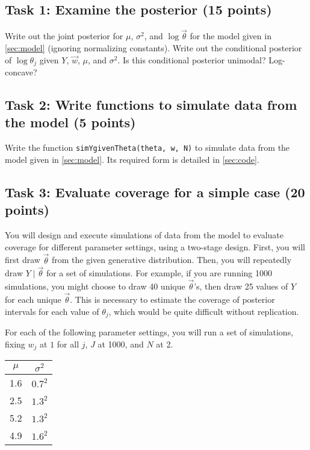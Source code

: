 \documentclass[11pt]{article}
\begin{document}
\subsection{Task 1: Examine the posterior (15 points)}

Write out the joint posterior for $\mu$, $\sigma^2$, and $\log \vec \theta$ for the model given in \autoref{sec:model} (ignoring normalizing constants). Write out the conditional posterior of $\log \theta_j$ given $Y$, $\vec w$, $\mu$, and $\sigma^2$. Is this conditional posterior unimodal? Log-concave?

\subsection{Task 2: Write functions to simulate data from the model (5 points)}

Write the function \verb+simYgivenTheta(theta, w, N)+ to simulate data from the model given in \autoref{sec:model}. Its required form is detailed in \autoref{sec:code}.

\subsection{Task 3: Evaluate coverage for a simple case (20 points)}

You will design and execute simulations of data from the model to evaluate coverage for different parameter settings, using a two-stage design. First, you will first draw $\vec \theta$ from the given generative distribution. Then, you will repeatedly draw $Y \mid \vec \theta$ for a set of simulations. For example, if you are running 1000 simulations, you might choose to draw 40 unique $\vec \theta$'s, then draw 25 values of $Y$ for each unique $\vec \theta$. This is necessary to estimate the coverage of posterior intervals for each value of $\theta_j$, which would be quite difficult without replication.

For each of the following parameter settings, you will run a set of simulations, fixing $w_j$ at $1$ for all $j$, $J$ at 1000, and $N$ at 2.
\begin{table}[ht]
\begin{center}
 \begin{tabular}{c|c}
  $\mu$ & $\sigma^2$ \\
  \hline
  1.6 & $0.7^2$ \\
  2.5 & $1.3^2$ \\
  5.2 & $1.3^2$ \\
  4.9 & $1.6^2$
 \end{tabular}
\end{center}
\end{table}
\end{document}
